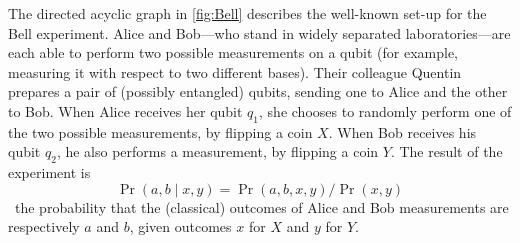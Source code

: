 \begin{example}
\label{ex:bell}
The directed acyclic graph in \cref{fig:Bell} describes the well-known set-up for the Bell experiment.
Alice and Bob---who stand in widely separated laboratories---are each able to perform two possible measurements on a qubit (for example, measuring it with respect to two different bases). 
Their colleague Quentin prepares a pair of (possibly entangled) qubits, sending one to Alice and the other to Bob. When Alice receives her qubit $q_1$, she chooses to randomly perform one of the two possible measurements, by flipping a coin $X$.
When Bob receives his qubit $q_2$, he also performs a measurement, by flipping a coin $Y$.
The result of the experiment is
\begin{equation}\label{eq:bell}
	\Pr(a,b\mid x,y) =\Pr(a,b,x,y) /\Pr(x,y)
\end{equation}
\ie\ the probability that the (classical) outcomes of Alice and Bob measurements are respectively $a$ and $b$, given outcomes $x$ for $X$ and $y$ for $Y$.
\end{example}

